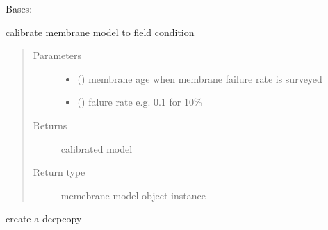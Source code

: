 \documentclass[letterpaper,10pt,english]{sphinxmanual}
\begin{document}
\begin{fulllineitems}
\label{\detokenize{membrane:membrane.Membrane_Model}}
\sphinxAtStartPar
Bases: 

\begin{fulllineitems}
\label{\detokenize{membrane:membrane.Membrane_Model.calibrate}}
\sphinxAtStartPar
calibrate membrane model to field condition
\begin{quote}\begin{description}
\item[{Parameters}] \leavevmode\begin{itemize}
\item {} 
\sphinxAtStartPar
{} (\sphinxstyleliteralemphasis{\sphinxupquote{, }}) \textendash{} membrane age when membrane failure rate is surveyed

\item {} 
\sphinxAtStartPar
{} () \textendash{} falure rate e.g. 0.1 for 10\%

\end{itemize}

\item[{Returns}] \leavevmode
\sphinxAtStartPar
calibrated model

\item[{Return type}] \leavevmode
\sphinxAtStartPar
memebrane model object instance

\end{description}\end{quote}

\end{fulllineitems}


\begin{fulllineitems}
\label{\detokenize{membrane:membrane.Membrane_Model.copy}}
\sphinxAtStartPar
create a deepcopy


\end{fulllineitems}
\end{fulllineitems}
\end{document}
